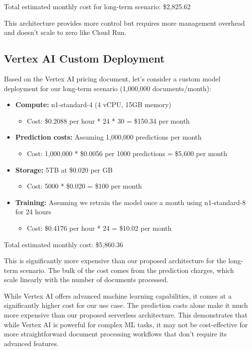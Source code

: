 \documentclass[a4paper, 12pt]{report}
\begin{document}
Total estimated monthly cost for long-term scenario: \$2,825.62

This architecture provides more control but requires more management overhead and doesn't scale to zero like Cloud Run.

\subsection{Vertex AI Custom Deployment}

Based on the Vertex AI pricing document, let's consider a custom model deployment for our long-term scenario (1,000,000 documents/month):

\begin{itemize}
    \item \textbf{Compute:} n1-standard-4 (4 vCPU, 15GB memory)
        \begin{itemize}
            \item Cost: \$0.2088 per hour * 24 * 30 = \$150.34 per month
        \end{itemize}
    \item \textbf{Prediction costs:} Assuming 1,000,000 predictions per month
        \begin{itemize}
            \item Cost: 1,000,000 * \$0.0056 per 1000 predictions = \$5,600 per month
        \end{itemize}
    \item \textbf{Storage:} 5TB at \$0.020 per GB
        \begin{itemize}
            \item Cost: 5000 * \$0.020 = \$100 per month
        \end{itemize}
    \item \textbf{Training:} Assuming we retrain the model once a month using n1-standard-8 for 24 hours
        \begin{itemize}
            \item Cost: \$0.4176 per hour * 24 = \$10.02 per month
        \end{itemize}
\end{itemize}

Total estimated monthly cost: \$5,860.36

This is significantly more expensive than our proposed architecture for the long-term scenario. The bulk of the cost comes from the prediction charges, which scale linearly with the number of documents processed.

While Vertex AI offers advanced machine learning capabilities, it comes at a significantly higher cost for our use case. The prediction costs alone make it much more expensive than our proposed serverless architecture. This demonstrates that while Vertex AI is powerful for complex ML tasks, it may not be cost-effective for more straightforward document processing workflows that don't require its advanced features.
\end{document}
